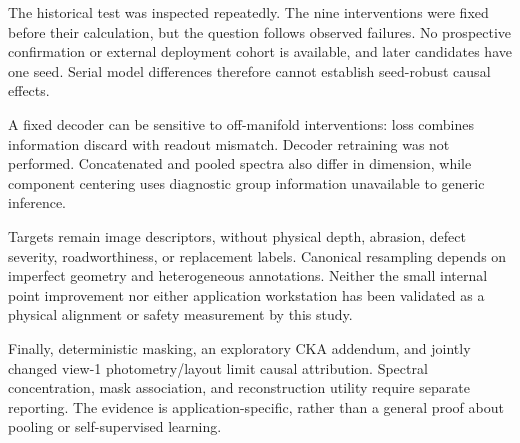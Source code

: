 The historical test was inspected repeatedly. The nine interventions were fixed before their calculation, but the question follows observed failures. No prospective confirmation or external deployment cohort is available, and later candidates have one seed. Serial model differences therefore cannot establish seed-robust causal effects.

A fixed decoder can be sensitive to off-manifold interventions: loss combines information discard with readout mismatch. Decoder retraining was not performed. Concatenated and pooled spectra also differ in dimension, while component centering uses diagnostic group information unavailable to generic inference.

Targets remain image descriptors, without physical depth, abrasion, defect severity, roadworthiness, or replacement labels. Canonical resampling depends on imperfect geometry and heterogeneous annotations. Neither the small internal point improvement nor either application workstation has been validated as a physical alignment or safety measurement by this study.

Finally, deterministic masking, an exploratory CKA addendum, and jointly changed view-1 photometry/layout limit causal attribution. Spectral concentration, mask association, and reconstruction utility require separate reporting. The evidence is application-specific, rather than a general proof about pooling or self-supervised learning.
